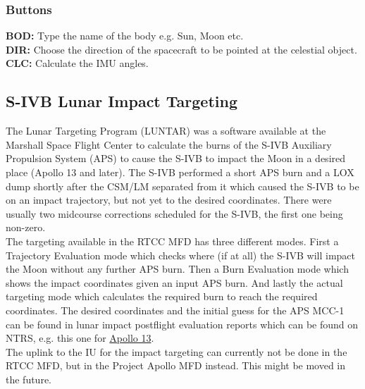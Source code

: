 \documentclass[11pt]{article} %
\begin{document}
\subsubsection{Buttons}

\textbf{BOD:} Type the name of the body e.g. Sun, Moon etc.\\
\textbf{DIR:} Choose the direction of the spacecraft to be pointed at the celestial object.\\
\textbf{CLC:} Calculate the IMU angles.\\
\newpage
\subsection{S-IVB Lunar Impact Targeting}
The Lunar Targeting Program (LUNTAR) was a software available at the Marshall Space Flight Center to calculate the burns of the S-IVB Auxiliary Propulsion System (APS) to cause the S-IVB to impact the Moon in a desired place (Apollo 13 and later). The S-IVB performed a short APS burn and a LOX dump shortly after the CSM/LM separated from it which caused the S-IVB to be on an impact trajectory, but not yet to the desired coordinates. There were usually two midcourse corrections scheduled for the S-IVB, the first one being non-zero.\\

The targeting available in the RTCC MFD has three different modes. First a Trajectory Evaluation mode which checks where (if at all) the S-IVB will impact the Moon without any further APS burn. Then a Burn Evaluation mode which shows the impact coordinates given an input APS burn. And lastly the actual targeting mode which calculates the required burn to reach the required coordinates. The desired coordinates and the initial guess for the APS MCC-1 can be found in lunar impact postflight evaluation reports which can be found on NTRS, e.g. this one for \href{https://ntrs.nasa.gov/citations/19710002523}{Apollo 13}. \\

The uplink to the IU for the impact targeting can currently not be done in the RTCC MFD, but in the Project Apollo MFD instead. This might be moved in the future.\\
\end{document}
